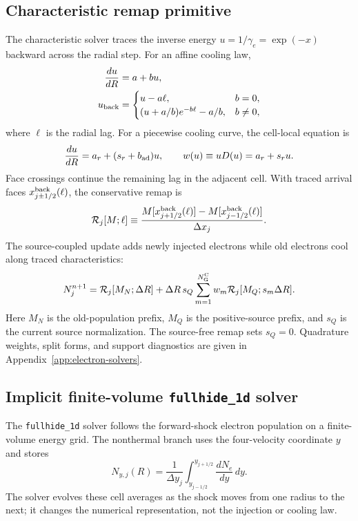 \documentclass[twocolumn]{aastex702}
\begin{document}
\subsection{Characteristic remap primitive}

The characteristic solver traces the inverse energy
\(u=1/\gamma_e=\exp(-x)\) backward across the radial step.  For an affine cooling
law,
\begin{equation}
\begin{aligned}
\frac{du}{dR}&=a+bu,\\
u_{\rm back}&=
\begin{cases}
u-a\ell, & b=0,\\
(u+a/b)e^{-b\ell}-a/b, & b\ne0,
\end{cases}
\end{aligned}
\end{equation}
where \(\ell\) is the radial lag.  For a piecewise cooling curve, the cell-local
equation is
\begin{equation}
\frac{du}{dR}=a_r+(s_r+b_{\rm ad})u,
\qquad w(u)\equiv uD(u)=a_r+s_ru .
\end{equation}
Face crossings continue the remaining lag in the adjacent cell.  With traced
arrival faces \(x_{j\pm1/2}^{\rm back}(\ell)\), the conservative remap is
\begin{equation}
\mathcal R_j[M;\ell]\equiv
\frac{
M[x_{j+1/2}^{\rm back}(\ell)]
-M[x_{j-1/2}^{\rm back}(\ell)]
}{\Delta x_j}.
\end{equation}
The source-coupled update adds newly injected electrons while old electrons cool
along traced characteristics:
\begin{equation}
N_j^{n+1}
=\mathcal R_j[M_N;\Delta R]
+\Delta R\,s_Q
\sum_{m=1}^{N_{\rm G}^{\rm C}}w_m\mathcal R_j[M_Q;s_m\Delta R].
\end{equation}
Here \(M_N\) is the old-population prefix, \(M_Q\) is the positive-source prefix,
and \(s_Q\) is the current source normalization.  The source-free remap sets
\(s_Q=0\).  Quadrature weights, split forms, and support diagnostics are given in
Appendix~\ref{app:electron-solvers}.

\subsection{Implicit finite-volume \texttt{fullhide\_1d} solver}

The \texttt{fullhide\_1d} solver follows the forward-shock electron population on
a finite-volume energy grid.  The nonthermal branch uses the four-velocity
coordinate \(y\) and stores
\begin{equation}
N_{y,j}(R)=\frac{1}{\Delta y_j}
\int_{y_{j-1/2}}^{y_{j+1/2}}\frac{dN_e}{dy}\,dy .
\label{eq:fullhide-cell-average}
\end{equation}
The solver evolves these cell averages as the shock moves from one radius to the
next; it changes the numerical representation, not the injection or cooling law.
\end{document}
